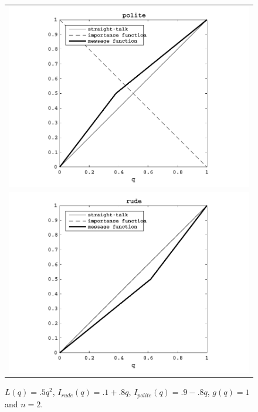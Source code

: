 \documentclass[12pt]{article}
\begin{document}
\begin{figure}[H]
\centering
\begin{tabular}{c}
\includegraphics{polite2v1} \\
\includegraphics{rude2v1}
\end{tabular}
\caption{$L(q)=.5q^2$, $I_{rude}(q)=.1+.8q$, $I_{polite}(q)=.9-.8q$, $g(q)=1$ and $n=2$.}
\end{figure}
\end{document}

